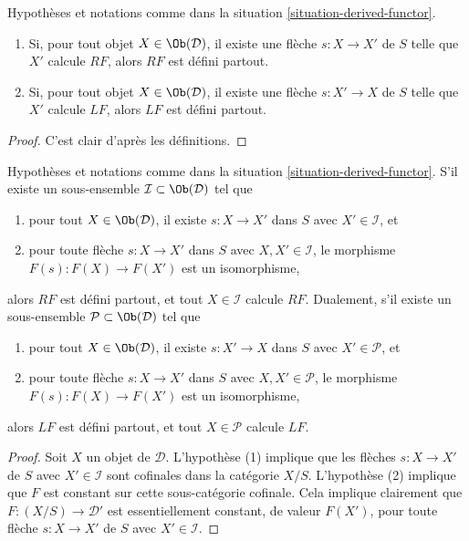\begin{lemma}
\label{lemma-existence-computes}
Hypothèses et notations comme dans la
situation \ref{situation-derived-functor}.
\begin{enumerate}
\item Si, pour tout objet $X \in \Ob(\mathcal{D})$, il existe une flèche
$s : X \to X'$ de $S$ telle que $X'$ calcule $RF$, alors $RF$ est défini
partout.
\item Si, pour tout objet $X \in \Ob(\mathcal{D})$, il existe une flèche
$s : X' \to X$ de $S$ telle que $X'$ calcule $LF$, alors $LF$ est défini
partout.
\end{enumerate}
\end{lemma}

\begin{proof}
C'est clair d'après les définitions.
\end{proof}

\begin{lemma}
\label{lemma-find-existence-computes}
Hypothèses et notations comme dans la
situation \ref{situation-derived-functor}. S'il existe un sous-ensemble
$\mathcal{I} \subset \Ob(\mathcal{D})$ tel que
\begin{enumerate}
\item pour tout $X \in \Ob(\mathcal{D})$, il existe
$s : X \to X'$ dans $S$ avec $X' \in \mathcal{I}$, et
\item pour toute flèche $s : X \to X'$ dans $S$ avec
$X, X' \in \mathcal{I}$, le morphisme $F(s) : F(X) \to F(X')$ est un
isomorphisme,
\end{enumerate}
alors $RF$ est défini partout, et tout $X \in \mathcal{I}$ calcule $RF$.
Dualement, s'il existe un sous-ensemble
$\mathcal{P} \subset \Ob(\mathcal{D})$ tel que
\begin{enumerate}
\item pour tout $X \in \Ob(\mathcal{D})$, il existe
$s : X' \to X$ dans $S$ avec $X' \in \mathcal{P}$, et
\item pour toute flèche $s : X \to X'$ dans $S$ avec
$X, X' \in \mathcal{P}$, le morphisme $F(s) : F(X) \to F(X')$ est un
isomorphisme,
\end{enumerate}
alors $LF$ est défini partout, et tout $X \in \mathcal{P}$ calcule $LF$.
\end{lemma}

\begin{proof}
Soit $X$ un objet de $\mathcal{D}$. L'hypothèse (1) implique que les flèches
$s : X \to X'$ de $S$ avec $X' \in \mathcal{I}$ sont cofinales dans la
catégorie $X/S$. L'hypothèse (2) implique que $F$ est constant sur cette
sous-catégorie cofinale. Cela implique clairement que
$F : (X/S) \to \mathcal{D}'$ est essentiellement constant, de valeur $F(X')$,
pour toute flèche $s : X \to X'$ de $S$ avec $X' \in \mathcal{I}$.
\end{proof}

